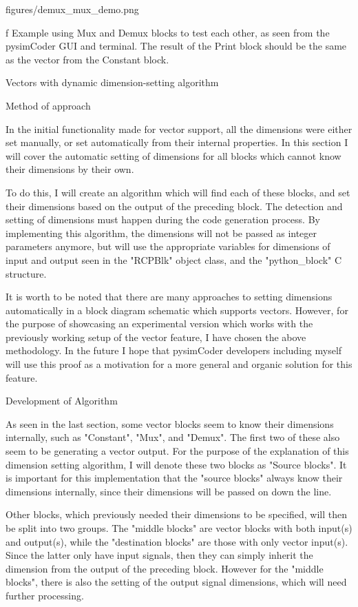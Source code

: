 \medskip {}
\picw=14cm \cinspic figures/demux_mux_demo.png
\caption/f Example using Mux and Demux blocks to test each other, as seen from the pysimCoder GUI and
terminal. The result of the Print block should be the same as the vector from the Constant block.
\medskip



\sec Vectors with dynamic dimension-setting algorithm

\secc Method of approach

\qquad In the initial functionality made for vector support, all the dimensions were either set manually,
or set automatically from their internal properties. In this section I will cover the automatic setting of
dimensions for all blocks which cannot know their dimensions by their own. 

\quad To do this, I will create an
algorithm which will find each of these blocks, and set their dimensions based on the output of the
preceding block. The detection and setting of dimensions must happen during the code generation process.
By implementing this algorithm, the dimensions will not be passed as integer parameters anymore, but will
use the appropriate variables for dimensions of input and output seen in the "RCPBlk" object class, and the
"python_block" C structure.

\quad It is worth to be noted that there are many approaches to setting dimensions automatically in a block
diagram schematic which supports vectors. However, for the purpose of showcasing an experimental version
which works with the previously working setup of the vector feature, I have chosen the above methodology.
In the future I hope that pysimCoder developers including myself will use this proof as a motivation for
a more general and organic solution for this feature.


\secc Development of Algorithm

\qquad As seen in the last section, some vector blocks seem to know their dimensions internally, such as
"Constant", "Mux", and "Demux". The first two of these also seem to be generating a vector output. For the
purpose of the explanation of this dimension setting algorithm, I will denote these two blocks as "Source
blocks". It is important for this implementation that the "source blocks" always know their dimensions
internally, since their dimensions will be passed on down the line.

\quad Other blocks, which previously needed their dimensions to be specified, will then be split into two
groups. The "middle blocks" are vector blocks with both input(s) and output(s), while the "destination
blocks" are those with only vector input(s). Since the latter only have input signals, then they can simply
inherit the dimension from the output of the preceding block. However for the "middle blocks", there is also
the setting of the output signal dimensions, which will need further processing.

